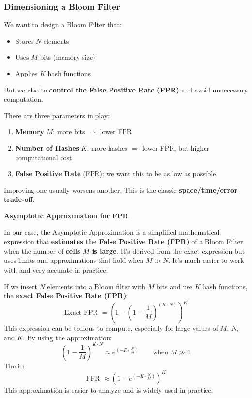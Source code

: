 \subsubsection{Dimensioning a Bloom Filter}

We want to design a Bloom Filter that:
\begin{itemize}
    \item Stores $N$ elements
    \item Uses $M$ bits (memory size)
    \item Applies $K$ hash functions
\end{itemize}
But we also to \textbf{control the False Positive Rate (FPR)} and avoid unnecessary computation.

\highspace
There are three parameters in play:
\begin{enumerate}
    \item \textbf{Memory} $M$: more bits $\Rightarrow$ lower FPR
    \item \textbf{Number of Hashes} $K$: more hashes $\Rightarrow$ lower FPR, but higher computational cost
    \item \textbf{False Positive Rate} (FPR): we want this to be as low as possible.
\end{enumerate}
Improving one usually worsens another. This is the classic \textbf{space/time/error trade-off}.

\highspace
\begin{flushleft}
    \textcolor{Green3}{ \textbf{Asymptotic Approximation for FPR}}
\end{flushleft}
In our case, the Asymptotic Approximation is a simplified mathematical expression that \textbf{estimates the False Positive Rate (FPR)} of a Bloom Filter when the number of \textbf{cells $M$ is large}. It's derived from the exact expression but uses limits and approximations that hold when $M \gg N$. It's much easier to work with and very accurate in practice.

\highspace
If we insert $N$ elements into a Bloom filter with $M$ bits and use $K$ hash functions, the \textbf{exact False Positive Rate (FPR)}:
\begin{equation}
    \text{Exact FPR } = \left(1 - \left(1 - \dfrac{1}{M}\right)^{\left(K \cdot N\right)}\right)^{K}
\end{equation}
This expression can be tedious to compute, especially for large values of $M$, $N$, and $K$. By using the approximation:
\begin{equation*}
    \left(1 - \dfrac{1}{M}\right)^{K \cdot N} \approx e^{\left(-K \cdot \frac{N}{M}\right)} \hspace{2em} \text{when } M \gg 1
\end{equation*}
The  is:
\begin{equation}
    \text{FPR } \approx \left(1 - e^{\left(-K \cdot \frac{N}{M}\right)}\right)^{K}
\end{equation}
This approximation is easier to analyze and is widely used in practice.

